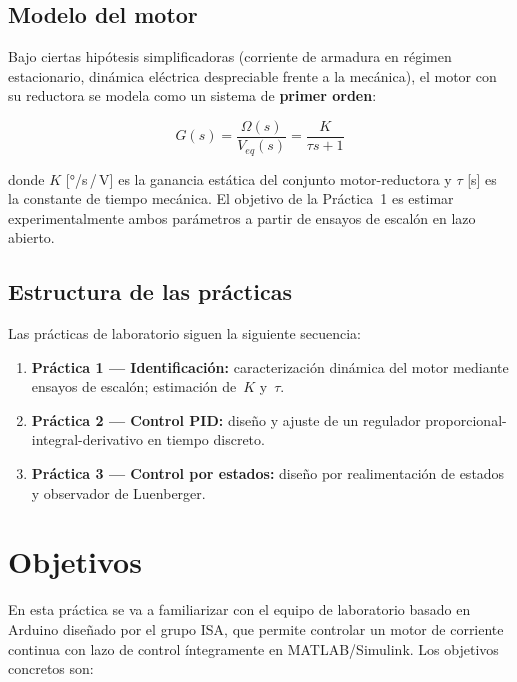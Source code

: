 \documentclass[12pt,a4paper]{article}
\begin{document}
\subsection{Modelo del motor}

Bajo ciertas hipótesis simplificadoras (corriente de armadura en régimen
estacionario, dinámica eléctrica despreciable frente a la mecánica), el motor
con su reductora se modela como un sistema de \textbf{primer orden}:

\begin{equation}
  G(s) = \frac{\Omega(s)}{V_{eq}(s)}
       = \frac{K}{\tau s + 1}
  \label{eq:modelo_motor}
\end{equation}

donde $K$ [°/s\,/\,V] es la ganancia estática del conjunto motor-reductora
y $\tau$ [s] es la constante de tiempo mecánica.  El objetivo de la
Práctica~1 es estimar experimentalmente ambos parámetros a partir de
ensayos de escalón en lazo abierto.

\subsection{Estructura de las prácticas}

Las prácticas de laboratorio siguen la siguiente secuencia:

\begin{enumerate}[noitemsep]
  \item \textbf{Práctica 1 — Identificación:} caracterización dinámica del
        motor mediante ensayos de escalón; estimación de~$K$ y~$\tau$.
  \item \textbf{Práctica 2 — Control PID:} diseño y ajuste de un regulador
        proporcional-integral-derivativo en tiempo discreto.
  \item \textbf{Práctica 3 — Control por estados:} diseño por
        realimentación de estados y observador de Luenberger.
\end{enumerate}

\section{Objetivos}

En esta práctica se va a familiarizar con el equipo de laboratorio basado en Arduino
diseñado por el grupo ISA, que permite controlar un motor de corriente continua
con lazo de control íntegramente en MATLAB/Simulink.
Los objetivos concretos son:
\end{document}
